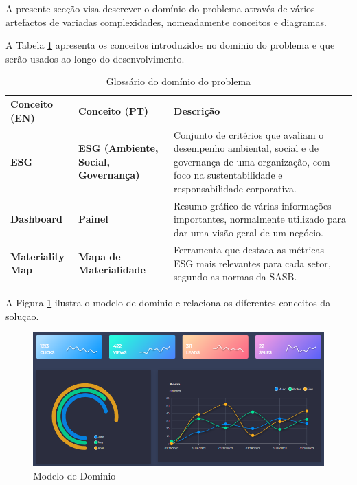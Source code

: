 A presente secção visa descrever o domínio do problema através de vários artefactos de variadas complexidades, nomeadamente conceitos e diagramas.

A Tabela \ref{tab:glossario_dominio} apresenta os conceitos introduzidos no dominio do problema e que serão usados ao longo do desenvolvimento.

\begin{table}[H]
    \renewcommand{\arraystretch}{1.2}
    \setlength{\tabcolsep}{10pt}
    \centering
    \begin{tabular}{>{\bfseries}p{3.5cm} >{\bfseries}p{4cm} p{7cm}}
        \rowcolor{purple!40}
        Conceito (EN) & Conceito (PT) & \textbf{Descrição} \\
        ESG & ESG (Ambiente, Social, Governança) & Conjunto de critérios que avaliam o desempenho ambiental, social e de governança de uma organização, com foco na sustentabilidade e responsabilidade corporativa. \\
        Dashboard & Painel & Resumo gráfico de várias informações importantes, normalmente utilizado para dar uma visão geral de um negócio. \\
        Materiality Map & Mapa de Materialidade & Ferramenta que destaca as métricas ESG mais relevantes para cada setor, segundo as normas da SASB. \\
    \end{tabular}
    \caption{Glossário do domínio do problema}
    \label{tab:glossario_dominio}
\end{table}

A Figura \ref{fig:domain_model} ilustra o modelo de dominio e relaciona os diferentes conceitos da soluçao.

\begin{figure}[h]
    \centering
    \includegraphics[width=\linewidth]{frontmatter/assets/apexchart.png}
    \caption{Modelo de Dominio}
    \label{fig:domain_model}
\end{figure}


